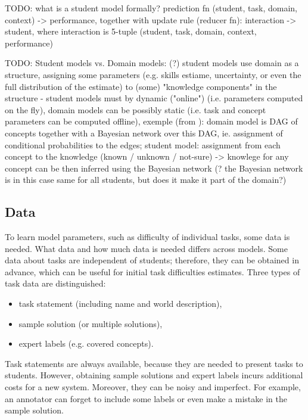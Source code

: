 TODO: what is a student model formally?
prediction fn (student, task, domain, context) -> performance,
together with update rule (reducer fn): interaction -> student,
where interaction is 5-tuple (student, task, domain, context, performance)

TODO: Student models vs. Domain models: (?) student models use domain as a
structure, assigning some parameters (e.g. skills estiame, uncertainty, or even
the full distribution of the estimate) to (some) "knowledge components" in the structure
- student models must by dynamic ("online") (i.e. parameters computed on the fly),
domain models can be possibly static (i.e. task and concept parameters can be computed offline),
exemple (from \cite{its-programming}): domain model is DAG of concepts together with a
Bayesian network over this DAG, ie. assignment of conditional probabilities to the edges;
student model: assignment from each concept to the knowledge (known / unknown / not-sure) -> knowlege for any concept can be then inferred using the Bayesian network
(? the Bayesian network is in this case same for all students, but does it make it part of the domain?)


\subsection{Data}
\label{sec:student-modeling.data}

To learn model parameters, such as difficulty of individual tasks, some data is needed.
What data and how much data is needed differs across models.
Some data about tasks are independent of students;
therefore, they can be obtained in advance,
which can be useful for initial task difficulties estimates.
Three types of task data are distinguished:

\begin{itemize}
  \item task statement (including name and world description),
  \item sample solution (or multiple solutions),
  \item expert labels (e.g. covered concepts).
\end{itemize}

Task statements are always available,
  because they are needed to present tasks to students.
However, obtaining sample solutions and expert labels
  incurs additional costs for a new system.
Moreover, they can be noisy and imperfect.
For example, an annotator can forget to include some labels
  or even make a mistake in the sample solution.

